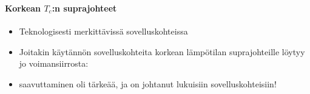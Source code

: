 \begin{frame}
\frametitle{\texorpdfstring{\culine[\sectiontitleulinecolor]{\sectiontitle}}{\sectiontitle} }
\framesubtitle{Korkean $T_c$:n suprajohteet}
\appear{}
\begin{itemize}
	\item Teknologisesti merkittävissä sovelluskohteissa  

\end{itemize}

\vspace{2.5mm}
\begin{minipage}{6cm}
\begin{itemize}[itemsep=1.6mm]
\item Joitakin käytännön sovelluskohteita korkean lämpötilan suprajohteille löytyy jo voimansiirrosta: 

\item {} saavuttaminen oli tärkeää, ja on johtanut lukuisiin sovelluskohteisiin! 

\end{itemize}
\end{minipage}


\end{frame}
